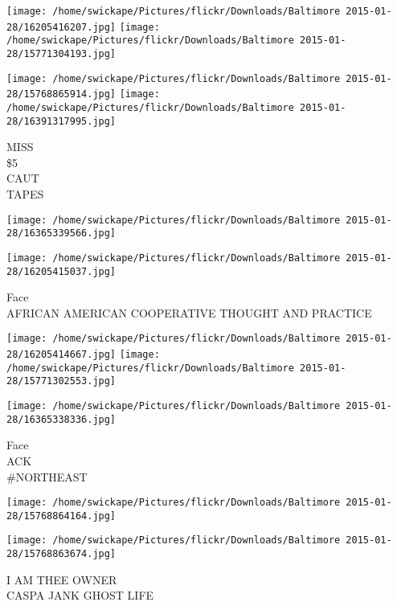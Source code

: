 \documentclass[10pt,letterpaper]{article}
\begin{document}
\texttt{[image: /home/swickape/Pictures/flickr/Downloads/Baltimore 2015-01-28/16205416207.jpg]}
\texttt{[image: /home/swickape/Pictures/flickr/Downloads/Baltimore 2015-01-28/15771304193.jpg]}

\texttt{[image: /home/swickape/Pictures/flickr/Downloads/Baltimore 2015-01-28/15768865914.jpg]}
\texttt{[image: /home/swickape/Pictures/flickr/Downloads/Baltimore 2015-01-28/16391317995.jpg]}

MISS\\
\$5\\
CAUT\\
TAPES
\pagebreak

\texttt{[image: /home/swickape/Pictures/flickr/Downloads/Baltimore 2015-01-28/16365339566.jpg]}

\vspace{0.25in}
\texttt{[image: /home/swickape/Pictures/flickr/Downloads/Baltimore 2015-01-28/16205415037.jpg]}

Face\\
AFRICAN AMERICAN COOPERATIVE THOUGHT AND PRACTICE
\pagebreak

\texttt{[image: /home/swickape/Pictures/flickr/Downloads/Baltimore 2015-01-28/16205414667.jpg]}
\texttt{[image: /home/swickape/Pictures/flickr/Downloads/Baltimore 2015-01-28/15771302553.jpg]}

\vspace{0.25in}
\texttt{[image: /home/swickape/Pictures/flickr/Downloads/Baltimore 2015-01-28/16365338336.jpg]}

Face\\
ACK\\
\#NORTHEAST
\pagebreak

\texttt{[image: /home/swickape/Pictures/flickr/Downloads/Baltimore 2015-01-28/15768864164.jpg]}

\vspace{0.25in}
\texttt{[image: /home/swickape/Pictures/flickr/Downloads/Baltimore 2015-01-28/15768863674.jpg]}

I AM THEE OWNER\\
CASPA JANK GHOST LIFE
\pagebreak
\end{document}

